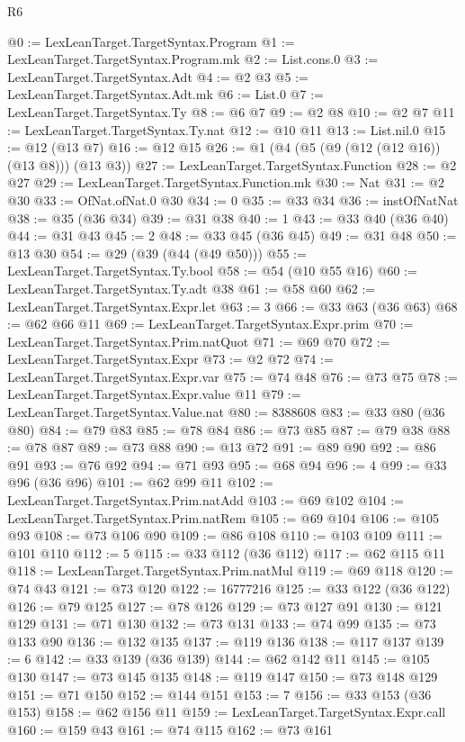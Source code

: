 \begin{lexlean}{R6}
\begin{coremodule}
@0 := LexLeanTarget.TargetSyntax.Program
@1 := LexLeanTarget.TargetSyntax.Program.mk
@2 := List.cons.{0}
@3 := LexLeanTarget.TargetSyntax.Adt
@4 := @2 @3
@5 := LexLeanTarget.TargetSyntax.Adt.mk
@6 := List.{0}
@7 := LexLeanTarget.TargetSyntax.Ty
@8 := @6 @7
@9 := @2 @8
@10 := @2 @7
@11 := LexLeanTarget.TargetSyntax.Ty.nat
@12 := @10 @11
@13 := List.nil.{0}
@15 := @12 (@13 @7)
@16 := @12 @15
@26 := @1 (@4 (@5 (@9 (@12 (@12 @16)) (@13 @8))) (@13 @3))
@27 := LexLeanTarget.TargetSyntax.Function
@28 := @2 @27
@29 := LexLeanTarget.TargetSyntax.Function.mk
@30 := Nat
@31 := @2 @30
@33 := OfNat.ofNat.{0} @30
@34 := 0
@35 := @33 @34
@36 := instOfNatNat
@38 := @35 (@36 @34)
@39 := @31 @38
@40 := 1
@43 := @33 @40 (@36 @40)
@44 := @31 @43
@45 := 2
@48 := @33 @45 (@36 @45)
@49 := @31 @48
@50 := @13 @30
@54 := @29 (@39 (@44 (@49 @50)))
@55 := LexLeanTarget.TargetSyntax.Ty.bool
@58 := @54 (@10 @55 @16)
@60 := LexLeanTarget.TargetSyntax.Ty.adt @38
@61 := @58 @60
@62 := LexLeanTarget.TargetSyntax.Expr.let
@63 := 3
@66 := @33 @63 (@36 @63)
@68 := @62 @66 @11
@69 := LexLeanTarget.TargetSyntax.Expr.prim
@70 := LexLeanTarget.TargetSyntax.Prim.natQuot
@71 := @69 @70
@72 := LexLeanTarget.TargetSyntax.Expr
@73 := @2 @72
@74 := LexLeanTarget.TargetSyntax.Expr.var
@75 := @74 @48
@76 := @73 @75
@78 := LexLeanTarget.TargetSyntax.Expr.value @11
@79 := LexLeanTarget.TargetSyntax.Value.nat
@80 := 8388608
@83 := @33 @80 (@36 @80)
@84 := @79 @83
@85 := @78 @84
@86 := @73 @85
@87 := @79 @38
@88 := @78 @87
@89 := @73 @88
@90 := @13 @72
@91 := @89 @90
@92 := @86 @91
@93 := @76 @92
@94 := @71 @93
@95 := @68 @94
@96 := 4
@99 := @33 @96 (@36 @96)
@101 := @62 @99 @11
@102 := LexLeanTarget.TargetSyntax.Prim.natAdd
@103 := @69 @102
@104 := LexLeanTarget.TargetSyntax.Prim.natRem
@105 := @69 @104
@106 := @105 @93
@108 := @73 @106 @90
@109 := @86 @108
@110 := @103 @109
@111 := @101 @110
@112 := 5
@115 := @33 @112 (@36 @112)
@117 := @62 @115 @11
@118 := LexLeanTarget.TargetSyntax.Prim.natMul
@119 := @69 @118
@120 := @74 @43
@121 := @73 @120
@122 := 16777216
@125 := @33 @122 (@36 @122)
@126 := @79 @125
@127 := @78 @126
@129 := @73 @127 @91
@130 := @121 @129
@131 := @71 @130
@132 := @73 @131
@133 := @74 @99
@135 := @73 @133 @90
@136 := @132 @135
@137 := @119 @136
@138 := @117 @137
@139 := 6
@142 := @33 @139 (@36 @139)
@144 := @62 @142 @11
@145 := @105 @130
@147 := @73 @145 @135
@148 := @119 @147
@150 := @73 @148 @129
@151 := @71 @150
@152 := @144 @151
@153 := 7
@156 := @33 @153 (@36 @153)
@158 := @62 @156 @11
@159 := LexLeanTarget.TargetSyntax.Expr.call
@160 := @159 @43
@161 := @74 @115
@162 := @73 @161

\end{coremodule}
\end{lexlean}
